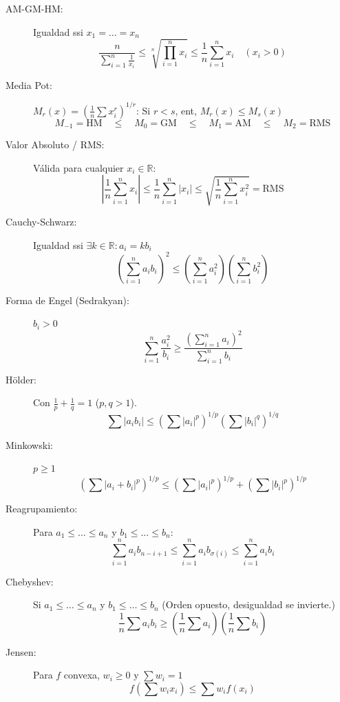 \begin{description}
    \item[AM-GM-HM:]  Igualdad ssi $x_1 = \dots = x_n$
    $$\frac{n}{\sum_{i=1}^n \frac{1}{x_i}} \le \sqrt[n]{\prod_{i=1}^n x_i} \le \frac{1}{n} \sum_{i=1}^n x_i \quad (x_i > 0)$$
    
    \item[Media Pot:]  $M_r(x) = \left( \frac{1}{n} \sum x_i^r \right)^{1/r}$: Si
    $r < s$, ent, $M_r(x) \le M_s(x)$
    $$M_{-1} = \text{HM} \quad \le \quad  M_0 = \text{GM} \quad \le  \quad M_1 = \text{AM} \quad \le  \quad M_2 = \text{RMS}$$
    
    
    \item[Valor Absoluto / RMS:] Válida para cualquier $x_i \in \mathbb{R}$:
    $$\left\vert{} \frac{1}{n} \sum_{i=1}^n x_i \right\vert{} \le \frac{1}{n} \sum_{i=1}^n \vert{}x_i\vert{} \le \sqrt{\frac{1}{n} \sum_{i=1}^n x_i^2} = \text{RMS}$$
    
    \item[Cauchy-Schwarz:] Igualdad ssi $\exists k \in \mathbb{R} : a_i = k b_i$
    $$\left( \sum_{i=1}^n a_i b_i \right)^2 \le \left( \sum_{i=1}^n a_i^2 \right) \left( \sum_{i=1}^n b_i^2 \right)$$ 
    
    \item[Forma de Engel (Sedrakyan):]  $b_i > 0$
    $$\sum_{i=1}^n \frac{a_i^2}{b_i} \ge \frac{\left( \sum_{i=1}^n a_i \right)^2}{\sum_{i=1}^n b_i} $$
    
    \item[Hölder:] Con $\frac{1}{p} + \frac{1}{q} = 1$ ($p, q > 1$).
    $$\sum |a_i b_i| \le \left( \sum |a_i|^p \right)^{1/p} \left( \sum |b_i|^q \right)^{1/q}$$ 
    
    \item[Minkowski:] $p \ge 1 $
    $$\left( \sum |a_i + b_i|^p \right)^{1/p} \le \left( \sum |a_i|^p \right)^{1/p} + \left( \sum |b_i|^p \right)^{1/p} $$
    
    \item[Reagrupamiento:] Para $a_1 \le \dots \le a_n$ y $b_1 \le \dots \le b_n$: 
    $$\sum_{i=1}^n a_i b_{n-i+1} \le \sum_{i=1}^n a_i b_{\sigma(i)} \le \sum_{i=1}^n a_i b_i$$
    
    \item[Chebyshev:] Si $a_1 \le \dots \le a_n$ y $b_1 \le \dots \le b_n  $ (Orden opuesto, desigualdad se invierte.)
    $$\frac{1}{n} \sum a_i b_i \ge \left( \frac{1}{n} \sum a_i \right) \left( \frac{1}{n} \sum b_i \right)$$ 
   

    \item[Jensen:] Para $f$ convexa, $w_i \ge 0$ y $\sum w_i = 1$
    $$f\left( \sum w_i x_i \right) \le \sum w_i f(x_i)$$
    

\end{description}
